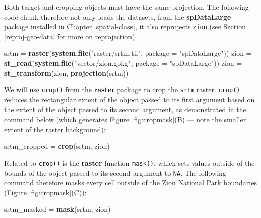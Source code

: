 \documentclass[]{krantz}
\newenvironment{Shaded}{\begin{snugshade}}{\end{snugshade}}
\newcommand{\DataTypeTok}[1]{\textcolor[rgb]{0.27,0.27,0.27}{#1}}
\newcommand{\KeywordTok}[1]{\textcolor[rgb]{0.27,0.27,0.27}{\textbf{#1}}}
\newcommand{\NormalTok}[1]{#1}
\newcommand{\StringTok}[1]{\textcolor[rgb]{0.5,0.5,0.5}{#1}}
\begin{document}
Both target and cropping objects must have the same projection.
The following code chunk therefore not only loads the datasets, from the \textbf{spDataLarge} package installed in Chapter \ref{spatial-class},
it also reprojects \texttt{zion} (see Section \ref{reproj-geo-data} for more on reprojection):

\begin{Shaded}
\begin{Highlighting}[]
\NormalTok{srtm =}\StringTok{ }\KeywordTok{raster}\NormalTok{(}\KeywordTok{system.file}\NormalTok{(}\StringTok{"raster/srtm.tif"}\NormalTok{, }\DataTypeTok{package =} \StringTok{"spDataLarge"}\NormalTok{))}
\NormalTok{zion =}\StringTok{ }\KeywordTok{st_read}\NormalTok{(}\KeywordTok{system.file}\NormalTok{(}\StringTok{"vector/zion.gpkg"}\NormalTok{, }\DataTypeTok{package =} \StringTok{"spDataLarge"}\NormalTok{))}
\NormalTok{zion =}\StringTok{ }\KeywordTok{st_transform}\NormalTok{(zion, }\KeywordTok{projection}\NormalTok{(srtm))}
\end{Highlighting}
\end{Shaded}

We will use \texttt{crop()} from the \textbf{raster} package to crop the \texttt{srtm} raster.
\texttt{crop()} reduces the rectangular extent of the object passed to its first argument based on the extent of the object passed to its second argument, as demonstrated in the command below (which generates Figure \ref{fig:cropmask}(B) --- note the smaller extent of the raster background):

\begin{Shaded}
\begin{Highlighting}[]
\NormalTok{srtm_cropped =}\StringTok{ }\KeywordTok{crop}\NormalTok{(srtm, zion)}
\end{Highlighting}
\end{Shaded}

Related to \texttt{crop()} is the \textbf{raster} function \texttt{mask()}, which sets values outside of the bounds of the object passed to its second argument to \texttt{NA}.
The following command therefore masks every cell outside of the Zion National Park boundaries (Figure \ref{fig:cropmask}(C)):

\begin{Shaded}
\begin{Highlighting}[]
\NormalTok{srtm_masked =}\StringTok{ }\KeywordTok{mask}\NormalTok{(srtm, zion)}
\end{Highlighting}
\end{Shaded}
\end{document}
